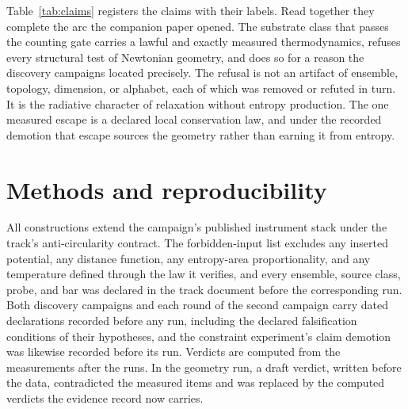 \documentclass[aps,pre,reprint,nofootinbib]{revtex4-2}
\begin{document}
Table~\ref{tab:claims} registers the claims with their labels.  Read
together they complete the arc the companion paper opened.  The
substrate class that passes the counting gate carries a lawful and
exactly measured thermodynamics, refuses every structural test of
Newtonian geometry, and does so for a reason the discovery campaigns
located precisely.  The refusal is not an artifact of ensemble,
topology, dimension, or alphabet, each of which was removed or
refuted in turn.  It is the radiative character of relaxation
without entropy production.  The one measured escape is a declared
local conservation law, and under the recorded demotion that escape
sources the geometry rather than earning it from entropy.

\section{Methods and reproducibility}
\label{sec:methods}

All constructions extend the campaign's published instrument stack
\cite{SourcesPaper, AreaGatePaper} under the track's
anti-circularity contract.  The forbidden-input list excludes any
inserted potential, any distance function, any entropy-area
proportionality, and any temperature defined through the law it
verifies, and every ensemble, source class, probe, and bar was
declared in the track document before the corresponding run.  Both
discovery campaigns and each round of the second campaign carry
dated declarations recorded before any run, including the declared
falsification conditions of their hypotheses, and the constraint
experiment's claim demotion was likewise recorded before its run.
Verdicts are computed from the measurements after the runs.  In the geometry run, a draft verdict, written before the data,
contradicted the measured items and was replaced by the computed
verdicts the evidence record now carries.
\end{document}
